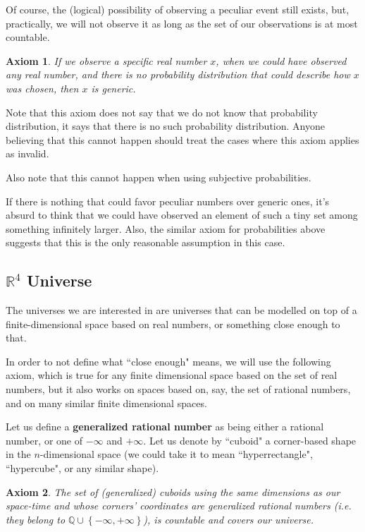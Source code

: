 \documentclass[a4paper
,draft
]{article}
\def\reale{\mathbb{R}}
\def\rationale{\mathbb{Q}}
\newcommand{\multime}[1]{\left\{ #1 \right\}}
\newcommand{\definitie}[1]{\textbf{#1}}
\newcommand{\ghilimele}[1]{``#1"}
\newtheorem{axiom}{Axiom}
\begin{document}
Of course, the (logical) possibility of observing a peculiar event still exists,
but, practically, we will not observe it as long as the set of our
observations is at most countable.

\begin{axiom}\label{ax:noprobability}
  If we observe a specific real number $x$, when we could have
  observed any real number, and there is no probability distribution that could
  describe how $x$ was chosen, then $x$ is generic.
\end{axiom}

Note that this axiom does not say that we do not know that probability
distribution, it says that there is no such probability distribution.
Anyone believing that this cannot happen should treat the cases where
this axiom applies as invalid.

Also note that this cannot happen when using subjective probabilities.

If there is nothing that could favor
peculiar numbers over generic ones, it's absurd to think that we could have
observed an element of such a tiny set among something infinitely larger.
Also, the similar axiom for probabilities above suggests that this is the only
reasonable assumption in this case.

\subsection{$\reale^4$ Universe}

The universes we are interested in are universes that can be
modelled on top of a finite-dimensional space based on real numbers,
or something close enough to that.

In order to not define what \ghilimele{close enough} means, we will use
the following axiom, which is true for any finite dimensional space
based on the set of real numbers, but it also works on spaces based on,
say, the set of rational numbers, and on many similar finite dimensional spaces.

Let us define a \definitie{generalized rational number} as being either a
rational number, or one of $-\infty$ and $+\infty$. Let us denote by
\ghilimele{cuboid} a corner-based shape in the $n$-dimensional space
(we could take it to mean \ghilimele{hyperrectangle}, \ghilimele{hypercube},
or any similar shape).

\begin{axiom}\label{ax:rationalcovering}
  The set of (generalized) cuboids using the same dimensions as our space-time
  and whose corners' coordinates are generalized rational numbers (i.e. they
  belong to $\rationale\cup\multime{-\infty, +\infty}$),
  is countable and covers our universe.
\end{axiom}
\end{document}
